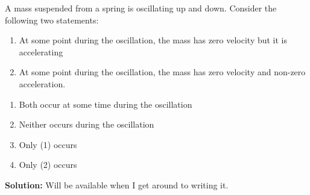\begin{example}
  A mass suspended from a spring is oscillating up and down. Consider the
  following two statements:
  \begin{enumerate}[nosep]
  \item At some point during the oscillation, the mass has zero velocity but
    it is accelerating
  \item At some point during the oscillation, the mass has zero velocity and
    non-zero acceleration.
  \end{enumerate}
  \begin{enumerate}[nosep]
  \item Both occur at some time during the oscillation
  \item Neither occurs during the oscillation
  \item Only (1) occurs
  \item Only (2) occurs
  \end{enumerate}

  \textbf{Solution:} Will be available when I get around to writing it.
\end{example}




